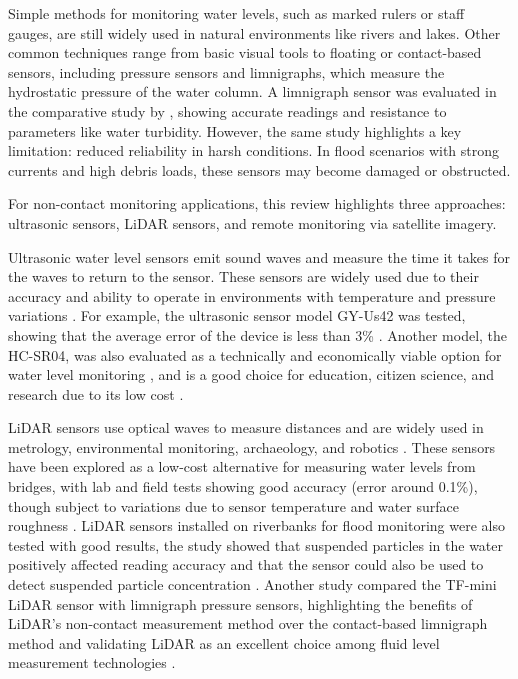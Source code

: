\documentclass[conference]{IEEEtran}
\begin{document}
Simple methods for monitoring water levels, such as marked rulers or staff gauges, are still widely used in natural environments like rivers and lakes. Other common techniques range from basic visual tools to floating or contact-based sensors, including pressure sensors and limnigraphs, which measure the hydrostatic pressure of the water column. A limnigraph sensor was evaluated in the comparative study by \cite{santana_2024_development}, showing accurate readings and resistance to parameters like water turbidity. However, the same study highlights a key limitation: reduced reliability in harsh conditions. In flood scenarios with strong currents and high debris loads, these sensors may become damaged or obstructed.

For non-contact monitoring applications, this review highlights three approaches: ultrasonic sensors, LiDAR sensors, and remote monitoring via satellite imagery.

Ultrasonic water level sensors emit sound waves and measure the time it takes for the waves to return to the sensor. These sensors are widely used due to their accuracy and ability to operate in environments with temperature and pressure variations \cite{mohammadrezamasoudimoghaddam_2024_a, pereira_2022_evaluation}. For example, the ultrasonic sensor model GY-Us42 was tested, showing that the average error of the device is less than 3\% \cite{mohammadrezamasoudimoghaddam_2024_a}. Another model, the HC-SR04, was also evaluated as a technically and economically viable option for water level monitoring \cite{pereira_2022_evaluation}, and is a good choice for education, citizen science, and research due to its low cost \cite{bresnahan_2023_a}.

LiDAR sensors use optical waves to measure distances and are widely used in metrology, environmental monitoring, archaeology, and robotics \cite{behroozpour_2017_lidar, li_2022_a}.
These sensors have been explored as a low-cost alternative for measuring water levels from bridges, with lab and field tests showing good accuracy (error around 0.1\%), though subject to variations due to sensor temperature and water surface roughness \cite{paul_2020_a}. LiDAR sensors installed on riverbanks for flood monitoring were also tested with good results, the study showed that suspended particles in the water positively affected reading accuracy and that the sensor could also be used to detect suspended particle concentration \cite{tamari_2016_flash}. Another study compared the TF-mini LiDAR sensor with limnigraph pressure sensors, highlighting the benefits of LiDAR’s non-contact measurement method over the contact-based limnigraph method and validating LiDAR as an excellent choice among fluid level measurement technologies \cite{santana_2024_development}.
\end{document}
